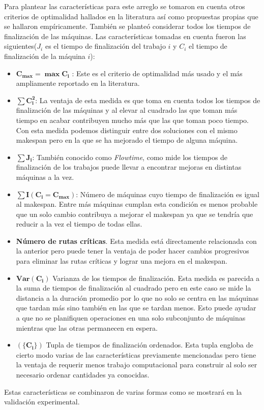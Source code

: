 Para plantear las características para este arreglo se tomaron en cuenta otros criterios de optimalidad hallados en la literatura así como propuestas propias que se hallaron empíricamente. También se planteó considerar todos los tiempos de finalización de las máquinas. Las características tomadas en cuenta fueron las siguientes($J_i$ es el tiempo de finalización del trabajo $i$ y $C_i$ el tiempo de finalización de la máquina $i$):
\begin{itemize}
    \item $\mathbf{C_{max} = \max{C_i}}$ : Este es el criterio de optimalidad más usado y el más ampliamente reportado en la literatura. 
    \item $\mathbf{\sum C_i^2}$: La ventaja de esta medida es que toma en cuenta todos los tiempos de finalización de las máquinas y al elevar al cuadrado las que toman más tiempo en acabar contribuyen mucho más que las que toman poco tiempo. Con esta medida podemos distinguir entre dos soluciones con el mismo makespan pero en la que se ha mejorado el tiempo de alguna máquina.
    \item $\mathbf{\sum J_i}$: También conocido como \textit{Flowtime}, como mide los tiempos de finalización de los trabajos puede llevar a encontrar mejoras en distintas máquinas a la vez.
    \item $\mathbf{\sum I(C_i=C_{max})}$: Número de máquinas cuyo tiempo de finalización es igual al makespan. Entre más máquinas cumplan esta condición es menos probable que un solo cambio contribuya a mejorar el makespan ya que se tendría que reducir a la vez el tiempo de todas ellas. 
    \item \textbf{Número de rutas críticas}. Esta medida está directamente relacionada con la anterior pero puede tener la ventaja de poder hacer cambios progresivos para eliminar las rutas críticas y lograr una mejora en el makespan. 
    \item $\mathbf{Var(C_i)}$ Varianza de los tiempos de finalización. Esta medida es parecida a la suma de tiempos de finalización al cuadrado pero en este caso se mide la distancia a la duración promedio por lo que no solo se centra en las máquinas que tardan más sino también en las que se tardan menos. Esto puede ayudar a que no se planifiquen operaciones en una solo subconjunto de máquinas mientras que las otras permanecen en espera.
    \item $\mathbf{(\{C_i\})}$ Tupla de tiempos de finalización ordenados. Esta tupla engloba de cierto modo varias de las características previamente mencionadas pero tiene la ventaja de requerir menos trabajo computacional para construir al solo ser necesario ordenar cantidades ya conocidas.
\end{itemize}

Estas características se combinaron de varias formas como se mostrará en la validación experimental. 
